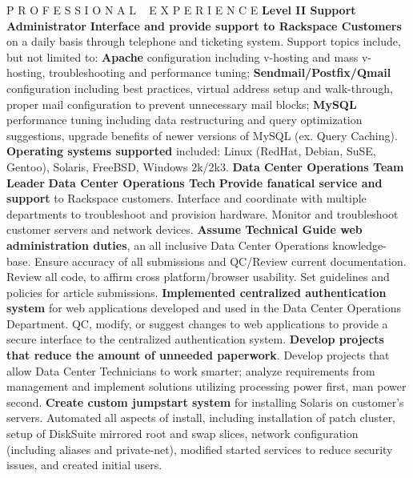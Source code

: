 \begin{rubric}{P R O F E S S I O N A L ~ E X P E R I E N C E}
			\textbf{Level II Support Administrator}
		\entry*\textbf{Interface and provide support to Rackspace Customers} on a daily basis through telephone and ticketing system.  Support topics include, but not limited to: \textbf{Apache} configuration including v-hosting and mass v-hosting, troubleshooting and performance tuning; \textbf{Sendmail/Postfix/Qmail} configuration including best practices, virtual address setup and walk-through, proper mail configuration to prevent unnecessary mail blocks; \textbf{MySQL} performance tuning including data restructuring and query optimization suggestions, upgrade benefits of newer versions of MySQL (ex. Query Caching).
        \entry*\textbf{Operating systems supported} included: Linux (RedHat, Debian, SuSE, Gentoo), Solaris, FreeBSD, Windows 2k/2k3.
			\textbf{Data Center Operations Team Leader}
			\textbf{Data Center Operations Tech}
		\entry*\textbf{Provide fanatical service and support} to Rackspace customers.  Interface and coordinate with multiple departments to troubleshoot and provision hardware.  Monitor and troubleshoot customer servers and network devices.
		\entry*\textbf{Assume Technical Guide web administration duties}, an all inclusive Data Center Operations knowledge-base.  Ensure accuracy of all submissions and QC/Review current documentation.  Review all code, to affirm cross platform/browser usability.  Set guidelines and policies for article submissions.
		\entry*\textbf{Implemented centralized authentication system} for web applications developed and used in the Data Center Operations Department.  QC, modify, or suggest changes to web applications to provide a secure interface to the centralized authentication system.
		\entry*\textbf{Develop projects that reduce the amount of unneeded paperwork}.  Develop projects that allow Data Center Technicians to work smarter; analyze requirements from management and implement solutions utilizing processing power first, man power second.
        \entry*\textbf{Create custom jumpstart system} for installing Solaris on customer's servers.  Automated all aspects of install, including installation of patch cluster, setup of DiskSuite mirrored root and swap slices, network configuration (including aliases and private-net), modified started services to reduce security issues, and created initial users.


\end{rubric}
